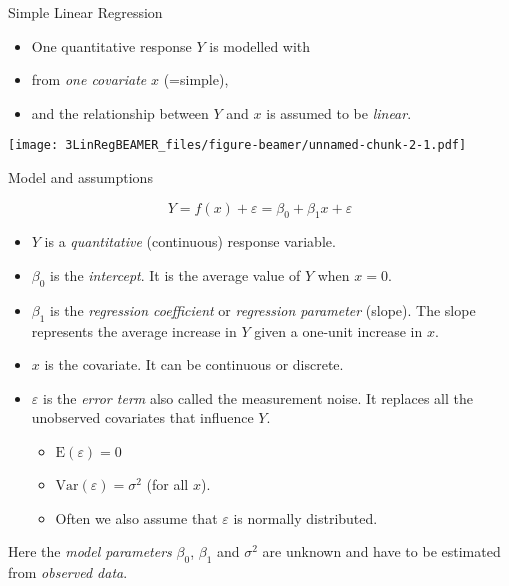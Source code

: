 \documentclass[ignorenonframetext,]{beamer}
\providecommand{\tightlist}{%
  \setlength{\itemsep}{0pt}\setlength{\parskip}{0pt}}
\begin{document}
\begin{frame}{Simple Linear Regression}

\begin{itemize}
\tightlist
\item
  One quantitative response \(Y\) is modelled with
\item
  from \emph{one covariate} \(x\) (=simple),
\item
  and the relationship between \(Y\) and \(x\) is assumed to be
  \emph{linear}.
\end{itemize}

\end{frame}

\begin{frame}

\texttt{[image: 3LinRegBEAMER\_files/figure-beamer/unnamed-chunk-2-1.pdf]}

\end{frame}

\begin{frame}

\begin{block}{Model and assumptions}

\[Y = f(x)+ \varepsilon= \beta_0 + \beta_1 x + \varepsilon\]

\begin{itemize}
\tightlist
\item
  \(Y\) is a \emph{quantitative} (continuous) response variable.
\item
  \(\beta_0\) is the \emph{intercept}. It is the average value of \(Y\)
  when \(x=0\).
\item
  \(\beta_1\) is the \emph{regression coefficient} or \emph{regression
  parameter} (slope). The slope represents the average increase in \(Y\)
  given a one-unit increase in \(x\).
\item
  \(x\) is the covariate. It can be continuous or discrete.
\item
  \(\varepsilon\) is the \emph{error term} also called the measurement
  noise. It replaces all the unobserved covariates that influence \(Y\).

  \begin{itemize}
  \tightlist
  \item
    \(\text{E}(\varepsilon)=0\)
  \item
    \(\text{Var}(\varepsilon)=\sigma^2\) (for all \(x\)).
  \item
    Often we also assume that \(\varepsilon\) is normally distributed.
  \end{itemize}
\end{itemize}

Here the \emph{model parameters} \(\beta_0\), \(\beta_1\) and
\(\sigma^2\) are unknown and have to be estimated from \emph{observed
data}.

\end{block}

\end{frame}
\end{document}
